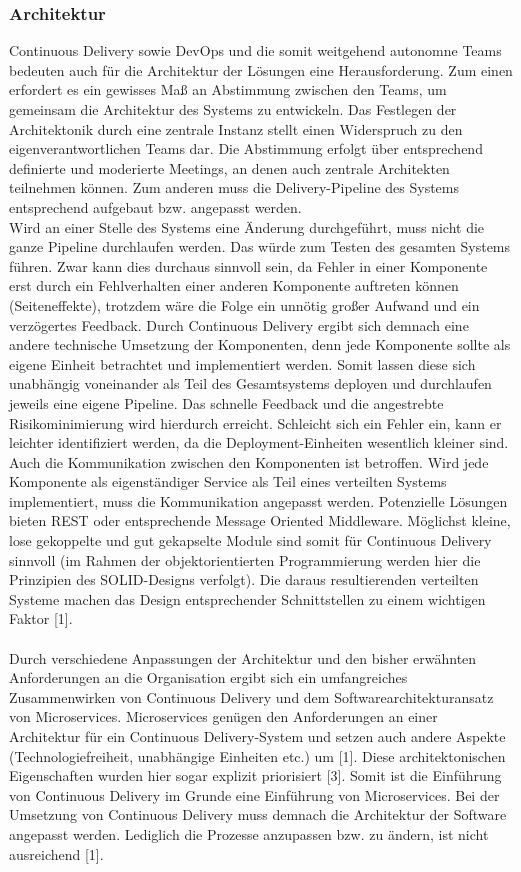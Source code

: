 \subsubsection{Architektur}
Continuous Delivery sowie DevOps und die somit weitgehend autonomne Teams bedeuten auch für die Architektur der Lösungen eine Herausforderung. Zum einen erfordert es ein gewisses Maß an Abstimmung zwischen den Teams, um gemeinsam die Architektur des Systems zu entwickeln. Das Festlegen der Architektonik durch eine zentrale Instanz stellt einen Widerspruch zu den eigenverantwortlichen Teams dar. Die Abstimmung erfolgt über entsprechend definierte und moderierte Meetings, an denen auch zentrale Architekten teilnehmen können. Zum anderen muss die Delivery-Pipeline des Systems entsprechend aufgebaut bzw. angepasst werden.\\ Wird an einer Stelle des Systems eine Änderung durchgeführt, muss nicht die ganze Pipeline durchlaufen werden. Das würde zum Testen des gesamten Systems führen. Zwar kann dies durchaus sinnvoll sein, da Fehler in einer Komponente erst durch ein Fehlverhalten einer anderen Komponente auftreten können (Seiteneffekte), trotzdem wäre die Folge ein unnötig großer Aufwand und ein verzögertes Feedback. Durch Continuous Delivery ergibt sich demnach eine andere technische Umsetzung der Komponenten, denn jede Komponente sollte als eigene Einheit betrachtet und implementiert werden. Somit lassen diese sich unabhängig voneinander als Teil des Gesamtsystems deployen und durchlaufen jeweils eine eigene Pipeline. Das schnelle Feedback und die angestrebte Risikominimierung wird hierdurch erreicht. Schleicht sich ein Fehler ein, kann er leichter identifiziert werden, da die Deployment-Einheiten wesentlich kleiner sind. Auch die Kommunikation zwischen den Komponenten ist betroffen. Wird jede Komponente als eigenständiger Service als Teil eines verteilten Systems implementiert, muss die Kommunikation angepasst werden. Potenzielle Lösungen bieten REST oder entsprechende Message Oriented Middleware. Möglichst kleine, lose gekoppelte und gut gekapselte Module sind somit für Continuous Delivery sinnvoll (im Rahmen der objektorientierten Programmierung werden hier die Prinzipien des SOLID-Designs verfolgt). Die daraus resultierenden verteilten Systeme machen das Design entsprechender Schnittstellen zu einem wichtigen Faktor [1]. \\ \\
Durch verschiedene Anpassungen der Architektur und den bisher erwähnten Anforderungen an die Organisation ergibt sich ein umfangreiches Zusammenwirken von Continuous Delivery und dem Softwarearchitekturansatz von Microservices. Microservices genügen den Anforderungen an einer Architektur für ein Continuous Delivery-System und setzen auch andere Aspekte (Technologiefreiheit, unabhängige Einheiten etc.) um [1]. Diese architektonischen Eigenschaften wurden hier sogar explizit priorisiert [3]. Somit ist die Einführung von Continuous Delivery im Grunde eine Einführung von Microservices. Bei der Umsetzung von Continuous Delivery muss demnach die Architektur der Software angepasst werden. Lediglich die Prozesse anzupassen bzw. zu ändern, ist nicht ausreichend [1].

